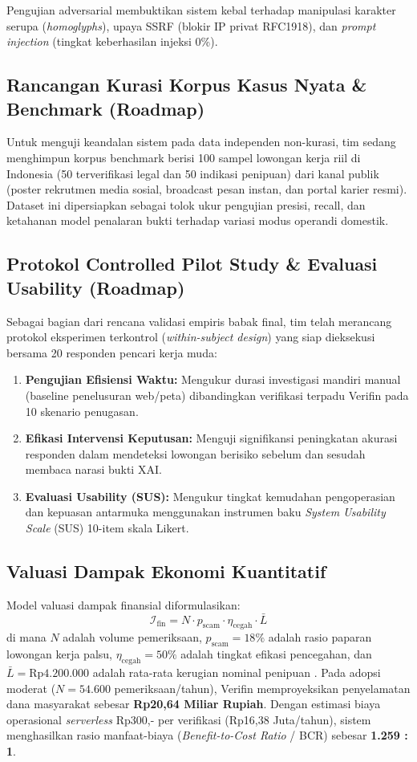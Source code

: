 \documentclass[conference]{IEEEtran}
\begin{document}
Pengujian adversarial membuktikan sistem kebal terhadap manipulasi karakter serupa (\textit{homoglyphs}), upaya SSRF (blokir IP privat RFC1918), dan \textit{prompt injection} (tingkat keberhasilan injeksi 0\%).

\subsection{Rancangan Kurasi Korpus Kasus Nyata \& Benchmark (Roadmap)}
Untuk menguji keandalan sistem pada data independen non-kurasi, tim sedang menghimpun korpus benchmark berisi 100 sampel lowongan kerja riil di Indonesia (50 terverifikasi legal dan 50 indikasi penipuan) dari kanal publik (poster rekrutmen media sosial, broadcast pesan instan, dan portal karier resmi). Dataset ini dipersiapkan sebagai tolok ukur pengujian presisi, recall, dan ketahanan model penalaran bukti terhadap variasi modus operandi domestik.

\subsection{Protokol Controlled Pilot Study \& Evaluasi Usability (Roadmap)}
Sebagai bagian dari rencana validasi empiris babak final, tim telah merancang protokol eksperimen terkontrol (\textit{within-subject design}) yang siap dieksekusi bersama 20 responden pencari kerja muda:
\begin{enumerate}
    \item \textbf{Pengujian Efisiensi Waktu:} Mengukur durasi investigasi mandiri manual (baseline penelusuran web/peta) dibandingkan verifikasi terpadu Verifin pada 10 skenario penugasan.
    \item \textbf{Efikasi Intervensi Keputusan:} Menguji signifikansi peningkatan akurasi responden dalam mendeteksi lowongan berisiko sebelum dan sesudah membaca narasi bukti XAI.
    \item \textbf{Evaluasi Usability (SUS):} Mengukur tingkat kemudahan pengoperasian dan kepuasan antarmuka menggunakan instrumen baku \textit{System Usability Scale} (SUS) 10-item skala Likert.
\end{enumerate}

\subsection{Valuasi Dampak Ekonomi Kuantitatif}
Model valuasi dampak finansial diformulasikan:
\begin{equation}
\mathcal{I}_{\text{fin}} = N \cdot p_{\text{scam}} \cdot \eta_{\text{cegah}} \cdot \bar{L}
\end{equation}
di mana $N$ adalah volume pemeriksaan, $p_{\text{scam}} = 18\%$ adalah rasio paparan lowongan kerja palsu, $\eta_{\text{cegah}} = 50\%$ adalah tingkat efikasi pencegahan, dan $\bar{L} = \text{Rp4.200.000}$ adalah rata-rata kerugian nominal penipuan \cite{gasa2024}. Pada adopsi moderat ($N = 54.600$ pemeriksaan/tahun), Verifin memproyeksikan penyelamatan dana masyarakat sebesar \textbf{Rp20,64 Miliar Rupiah}. Dengan estimasi biaya operasional \textit{serverless} Rp300,- per verifikasi (Rp16,38 Juta/tahun), sistem menghasilkan rasio manfaat-biaya (\textit{Benefit-to-Cost Ratio} / BCR) sebesar \textbf{1.259 : 1}.
\end{document}
